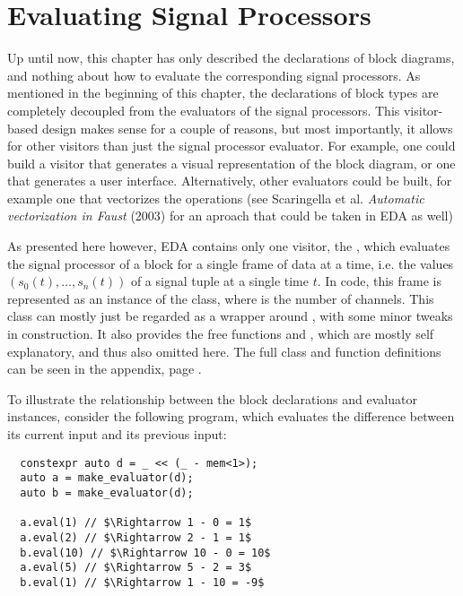 \section{Evaluating Signal Processors}
\label{sec:eda_eval}

Up until now, this chapter has only described the declarations of block diagrams, and nothing about how to
evaluate the corresponding signal processors. As mentioned in the beginning of this chapter, the declarations
of block types are completely decoupled from the evaluators of the signal processors. This visitor-based
design makes sense for a couple of reasons, but most importantly, it allows for other visitors than just the
signal processor evaluator. For example, one could build a visitor that generates a visual representation of
the block diagram, or one that generates a user interface. Alternatively, other evaluators could be built,
for example one that vectorizes the operations (see Scaringella et al. \emph{Automatic vectorization in Faust} (2003)
\autocite{faust_auto_vec} for an aproach that could be taken in EDA as well)

As presented here however, EDA contains only one visitor, the , which evaluates the
signal processor of a block for a single frame of data at a time, i.e. the values $(s_0(t), \dots, s_n(t))$ of a
signal tuple at a single time $t$. In code, this frame is represented as an instance of
the  class, where
 is the number of channels. This class can mostly just be regarded as a wrapper around , with some minor tweaks in construction. It also provides the free functions
 and , which are mostly self explanatory, and
thus also omitted here. The full class and function definitions can be seen in the appendix, page
\pageref{codefile:include/eda/frame.hpp}.

To illustrate the relationship between the block declarations and evaluator instances, consider the following
program, which evaluates the difference between its current input and its previous input:

\begin{verbatim}
  constexpr auto d = _ << (_ - mem<1>);
  auto a = make_evaluator(d);
  auto b = make_evaluator(d);
  
  a.eval(1) // $\Rightarrow 1 - 0 = 1$
  a.eval(2) // $\Rightarrow 2 - 1 = 1$
  b.eval(10) // $\Rightarrow 10 - 0 = 10$
  a.eval(5) // $\Rightarrow 5 - 2 = 3$
  b.eval(1) // $\Rightarrow 1 - 10 = -9$
\end{verbatim}

